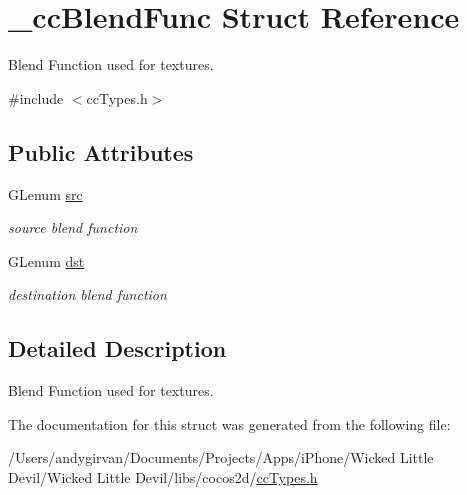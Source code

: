 \hypertarget{struct__cc_blend_func}{\section{\-\_\-cc\-Blend\-Func Struct Reference}
\label{struct__cc_blend_func}
}


Blend Function used for textures.  




{\ttfamily \#include $<$cc\-Types.\-h$>$}

\subsection*{Public Attributes}
\begin{DoxyCompactItemize}
\item 
\hypertarget{struct__cc_blend_func_a42eec7fdd463ecabe04cae2825e45d9b}{G\-Lenum \hyperlink{struct__cc_blend_func_a42eec7fdd463ecabe04cae2825e45d9b}{src}}\label{struct__cc_blend_func_a42eec7fdd463ecabe04cae2825e45d9b}

\begin{DoxyCompactList}\small\item\em source blend function \end{DoxyCompactList}\item 
\hypertarget{struct__cc_blend_func_ac0d691604ae447b1229658ba4fb8b07a}{G\-Lenum \hyperlink{struct__cc_blend_func_ac0d691604ae447b1229658ba4fb8b07a}{dst}}\label{struct__cc_blend_func_ac0d691604ae447b1229658ba4fb8b07a}

\begin{DoxyCompactList}\small\item\em destination blend function \end{DoxyCompactList}\end{DoxyCompactItemize}


\subsection{Detailed Description}
Blend Function used for textures. 

The documentation for this struct was generated from the following file\-:\begin{DoxyCompactItemize}
\item 
/\-Users/andygirvan/\-Documents/\-Projects/\-Apps/i\-Phone/\-Wicked Little Devil/\-Wicked Little Devil/libs/cocos2d/\hyperlink{cc_types_8h}{cc\-Types.\-h}\end{DoxyCompactItemize}
